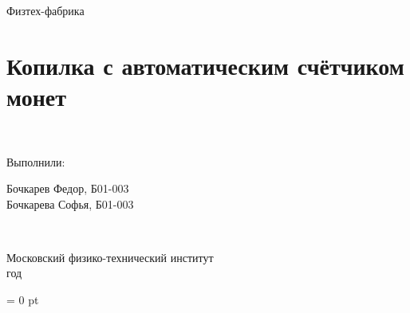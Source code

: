 \documentclass[a4paper,12pt]{extarticle}	%
\begin{document}
	\begin{titlepage}
	\begin{center}
	Физтех-фабрика\\
	\vspace*{5cm}

	\section*{Копилка с автоматическим счётчиком монет}

	\begin{minipage}{0.3\textwidth}
	~
	\end{minipage}
	\hfill
	\begin{minipage}{0.2\textwidth}
		Выполнили:
	\end{minipage}
	\begin{minipage}{0.4\textwidth}
		Бочкарев Федор, Б01-003\\
		Бочкарева Софья, Б01-003
	\end{minipage}

	\begin{flushright}\textbf{\\}\end{flushright}

	\vfill

	Московский физико-технический институт\\
	\the\year{} год

	\end{center}
	\end{titlepage}

	\parindent=0cm
	\parskip=1pt
	\reversemarginpar
	\marginparpush = 0 pt

	
	
	
	
	
	
	
	
\end{document}
